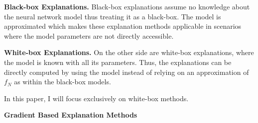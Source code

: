 \noindent\textbf{Black-box Explanations.} Black-box explanations assume no knowledge about the neural network model thus treating it as a black-box. The model is approximated which makes these explanation methods applicable in scenarios where the model parameters are not directly accessible. 

\noindent\textbf{White-box Explanations.} On the other side are white-box explanations, where the model is known with all its parameters. Thus, the explanations can be directly computed by using the model instead of relying on an approximation of $f_N$ as within the black-box models. 

In this paper, I will focus exclusively on white-box methods. 






\noindent\textbf{Gradient Based Explanation Methods}
